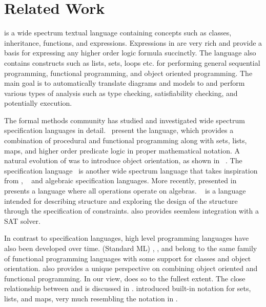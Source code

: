 \section{Related Work}
\label{sec:related-work}

\Klang{} is a wide spectrum textual language containing concepts such
as classes, inheritance, functions, and expressions. Expressions in
\Klang{} are very rich and provide a basis for expressing any higher
order logic formula succinctly. The language also contains constructs
such as lists, sets, loops etc. for performing general sequential
programming, functional programming, and object oriented
programming. The main goal is to automatically translate \sysml{}
diagrams and models to \Klang{} and perform various types of analysis
such as type checking, satisfiability checking, and potentially
execution.

The formal methods community has studied and investigated wide
spectrum specification languages in
detail.~\cite{vdm78,bjoerner-jones-82,jones90,jones-shaw-90} present
the \vdm{} language, which provides a combination of procedural and
functional programming along with sets, lists, maps, and higher order
predicate logic in proper mathematical notation. A natural evolution
of \vdm{} was to introduce object orientation, as shown in
\vdmpp{}~\cite{vdmplusplus05}. The \raiselang{} specification
language~\cite{raise92} is another wide spectrum language that takes
inspiration from \vdm{}, \zlang{}~\cite{spivey-Z-1988} and algebraic
specification languages. More recently, \asml{} presented
in~\cite{asml05} presents a language where all operations operate on
algebras. \alloy{}~\cite{jackson-alloy-12} is a language intended for
describing structure and exploring the design of the structure through
the specification of constraints. \alloy{} also provides seemless
integration with a SAT solver.

In contrast to specification languages, high level programming
languages have also been developed over time. \sml{} (Standard ML)
\cite{standard-ml-97}, \ocaml{} \cite{ocaml}, and \haskell{}
\cite{haskell} belong to the same family of functional programming
languages with some support for classes and object
orientation. \python{} \cite{python} also provides a unique
perspective on combining object oriented and functional
programming. In our view, \scala{} \cite{scala} does so to the fullest
extent. The close relationship between \scala{} and \vdm{} is
discussed in \cite{havelund-scala-vdm-12}.  \fortress{}
\cite{fortress} introduced built-in notation for sets, lists, and
maps, very much resembling the notation in \vdm{}.

